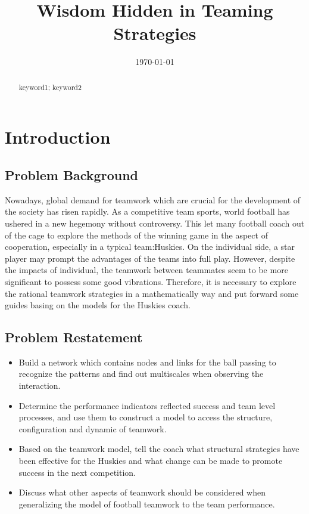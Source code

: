 \documentclass{mcmthesis}
\title{Wisdom Hidden in Teaming Strategies}
\date{\today}
\begin{document}
\begin{abstract}

\begin{keywords}
keyword1; keyword2
\end{keywords}
\end{abstract}
\maketitle
\tableofcontents
\newpage

\section{Introduction}
\subsection{Problem Background}
Nowadays, global demand for teamwork which are crucial for the development of the society has risen rapidly. As a competitive team sports, world football has ushered in a new hegemony without controversy. This let many football coach out of the cage to explore the methods of the winning game in the aspect of cooperation, especially in a typical team:Huskies. On the individual side, a star player may prompt the advantages of the teams into full play. However, despite the impacts of individual, the teamwork between teammates seem to be more significant to possess some good vibrations. Therefore, it is necessary to explore the rational teamwork strategies in a mathematically way and put forward some guides basing on the models for the Huskies coach.

\subsection{Problem Restatement}
\begin{itemize}
        \item Build a network which contains nodes and links for the ball passing to recognize the patterns and find out multiscales when observing the interaction.
        \item Determine the performance indicators reflected success and team level processes, and use them to construct a model to access the structure, configuration and dynamic of teamwork.
        \item Based on the teamwork model, tell the coach what structural strategies have been effective for the Huskies and what change can be made to promote success in the next competition.
        \item Discuss what other aspects of teamwork should be considered when generalizing the model of football teamwork to the team performance.
\end{itemize}
\end{document}
